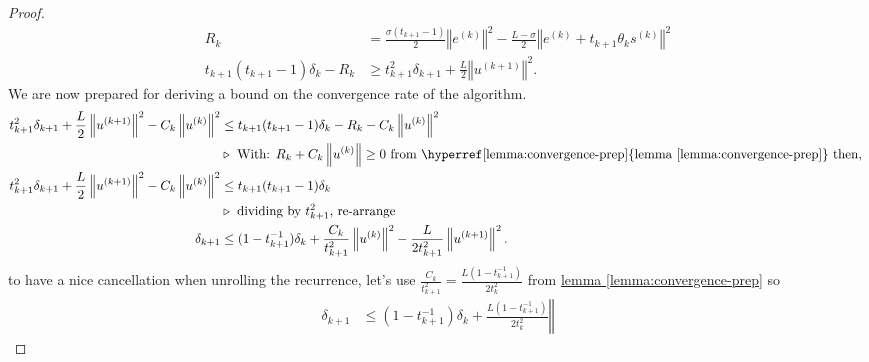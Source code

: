 \begin{proof}
        \begin{align}
            R_k &=  
            \frac{\sigma(t_{k + 1} - 1)}{2}
            \left\Vert e^{(k)}\right\Vert^2
            - 
            \frac{L - \sigma}{2}\left\Vert e^{(k)} + t_{k + 1}\theta_k s^{(k)}\right\Vert^2
            \\
            t_{k + 1}(t_{k + 1} - 1)\delta_k - R_k
            &\ge 
            t_{k + 1}^2\delta_{k + 1} + \frac{L}{2}\left\Vert u^{(k + 1)}\right\Vert^2. 
        \end{align}
        We are now prepared for deriving a bound on the convergence rate of the algorithm. 
        \begin{align*}
            t_{k + 1}^2\delta_{k + 1}  + 
            \frac{L}{2}\left\Vert
                u^{(k + 1)}
            \right\Vert^2 
            - 
            C_k
            \left\Vert
                u^{(k)}
            \right\Vert^2
            &\le
            t_{k + 1}(t_{k + 1} - 1)\delta_k - R_k
            -
            C_k
            \left\Vert
                u^{(k)}
            \right\Vert^2
            \\
            & \triangleright \text{ With:  $R_k + C_k\left\Vert
                u^{(k)}
            \right\Vert\ge 0$ from \hyperref[lemma:convergence-prep]{lemma \ref*{lemma:convergence-prep}} then, } 
            \\
            t_{k + 1}^2\delta_{k + 1} + \frac{L}{2}\left\Vert
                u^{(k + 1)}
            \right\Vert^2 
            - C_k
            \left\Vert
                u^{(k)}
            \right\Vert^2
            & \le 
            t_{k + 1}(t_{k + 1} - 1)\delta_k
            \\
            &\triangleright \text{ dividing by $t_{k + 1}^2$, re-arrange}
            \\
            \delta_{k + 1}
            &\le 
            (1 - t_{k + 1}^{-1}) \delta_k + \frac{C_k}{t_{k + 1}^{2}}\left\Vert
                u^{(k)}
            \right\Vert^2 -
            \frac{L}{2t^2_{k + 1}}\left\Vert
                u^{(k + 1)}
            \right\Vert^2. 
        \end{align*}
        to have a nice cancellation when unrolling the recurrence, let's use  $\frac{C_k}{t_{k + 1}^2} = \frac{L(1 - t^{-1}_{k + 1})}{2t_{k}^2}$ from \hyperref[lemma:convergence-prep]{lemma \ref*{lemma:convergence-prep}} so
        \begin{align*}
            \delta_{k + 1} &\le 
            (1 - t_{k + 1}^{-1})\delta_k + 
            \frac{L(1 - t_{k + 1}^{-1})}{2t_{k}^2} \left\Vert

\end{align*}
\end{proof}
